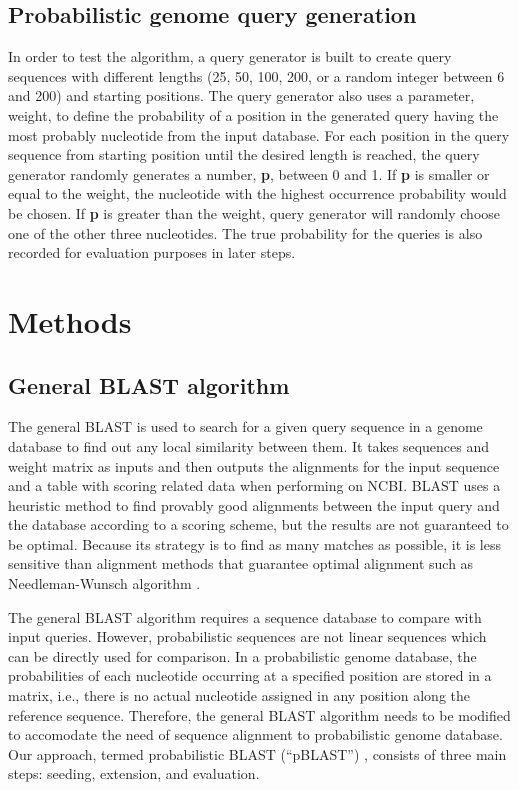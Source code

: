 \documentclass[12pt]{article}
\begin{document}
\subsection{Probabilistic genome query generation}
In order to test the algorithm, a query generator is built to create query sequences with different lengths (25, 50, 100, 200, or a random integer between 6 and 200) and starting positions. The query generator also uses a parameter, weight, to define the probability of a position in the generated query having the most probably nucleotide from the input database. For each position in the query sequence from starting position until the desired length is reached, the query generator randomly generates a number, \textbf{p}, between 0 and 1. If \textbf{p} is smaller or equal to the weight, the nucleotide with the highest occurrence probability would be chosen. If \textbf{p} is greater than the weight, query generator will randomly choose one of the other three nucleotides. The true probability for the queries is also recorded for evaluation purposes in later steps. 






\label{Methods}
\section{Methods}

\subsection{General BLAST algorithm}
The general BLAST is used to search for a given query sequence in a genome database to find out any local similarity between them. It takes sequences and weight matrix as inputs and then outputs the alignments for the input sequence and a table with scoring related data when performing on NCBI. BLAST uses a heuristic method to find provably  good alignments between the input query and the database according to a scoring scheme, but the results are not guaranteed to be optimal. Because its strategy is to find as many matches as possible, it is less sensitive than alignment methods that guarantee optimal alignment such as Needleman-Wunsch algorithm \cite{needleman1970}. 

The general BLAST algorithm requires a sequence database to compare with input queries. However, probabilistic sequences are not linear  sequences which can be directly used for comparison. In a probabilistic genome database, the probabilities of  each nucleotide occurring at a specified position are stored in a matrix, i.e.,  there is no actual nucleotide assigned in any position along the reference  sequence. Therefore, the general BLAST algorithm needs to be modified to accomodate the need of  sequence alignment to probabilistic genome database. Our approach, termed probabilistic BLAST (“pBLAST”) , consists of three main steps: seeding, extension, and evaluation.
\end{document}
